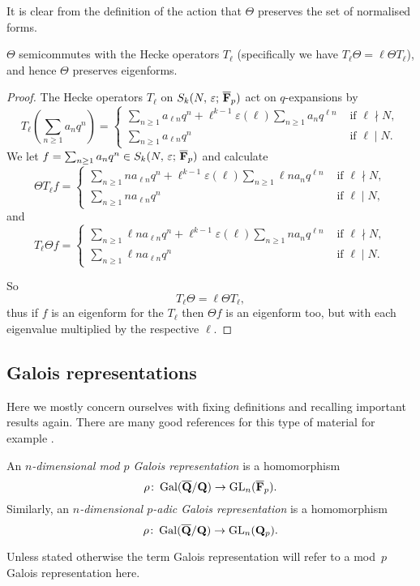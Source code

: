 \documentclass[a4paper,12pt]{article}
\begin{document}
It is clear from the definition of the action that $\Theta$ preserves the set of normalised forms.

\begin{prop}\label{prop:thetaeigen}
$\Theta$ semicommutes with the Hecke operators $T_{\ell}$ (specifically we have $T_{\ell}\Theta = \ell\Theta T_{\ell}$), and hence $\Theta$ preserves eigenforms.
\end{prop}
\begin{proof}
The Hecke operators $T_{\ell}$ on $S_k(N,\,\varepsilon;\,\overline{\mathbf{F}}_p)$ act on $q$-expansions by
\[
T_{\ell}\left(\sum_{n\ge 1} a_nq^n\right) = \begin{cases}
\sum_{n\ge 1} a_{\ell n}q^n + \ell^{k-1}\varepsilon(\ell)\sum_{n\ge 1} a_{n}q^{\ell n} &\text{ if }\ell \nmid N,\\
\sum_{n\ge 1} a_{\ell n}q^n &\text{ if }\ell \mid N.
\end{cases}
\]
We let $f = \sum_{n\ge 1} a_nq^n\in S_k(N,\,\varepsilon;\,\overline{\mathbf{F}}_p)$ and calculate
\[
\Theta T_{\ell} f = \begin{cases}
\sum_{n\ge 1} na_{\ell n}q^n + \ell^{k-1}\varepsilon(\ell)\sum_{n\ge 1} \ell n a_{n}q^{\ell n} &\text{ if }\ell \nmid N,\\
\sum_{n\ge 1} na_{\ell n}q^n &\text{ if }\ell \mid N,
\end{cases}
\]
and
\[
T_{\ell}\Theta f = \begin{cases}
\sum_{n\ge 1} \ell n a_{\ell n}q^n + \ell^{k-1}\varepsilon(\ell)\sum_{n\ge 1} n a_{n}q^{\ell n} &\text{ if }\ell \nmid N,\\
\sum_{n\ge 1} \ell n a_{\ell n}q^n &\text{ if }\ell \mid N.
\end{cases}
\]

So
\[
 T_{\ell} \Theta = \ell \Theta T_{\ell},
\]
thus if $f$ is an eigenform for the $T_\ell$ then $\Theta f$ is an eigenform too, but with each eigenvalue multiplied by the respective $\ell$.
\end{proof}


\subsection{Galois representations}\label{sec:gals}
Here we mostly concern ourselves with fixing definitions and recalling important results again.
There are many good references for this type of material for example \cite{WieseGal}.

\begin{defn}
An \emph{$n$-dimensional mod $p$ Galois representation} is a homomorphism
\[
\rho\colon \operatorname{Gal}(\overline{\mathbf{Q}}/\mathbf{Q}) \to \operatorname{GL}_n(\overline{\mathbf{F}}_p).
\]
Similarly, an \emph{$n$-dimensional $p$-adic Galois representation} is a homomorphism
\[
\rho\colon \operatorname{Gal}(\overline{\mathbf{Q}}/\mathbf{Q}) \to \operatorname{GL}_n(\mathbf{Q}_p).
\]

Unless stated otherwise the term Galois representation will refer to a mod~$p$ Galois representation here.
\end{defn}
\end{document}
